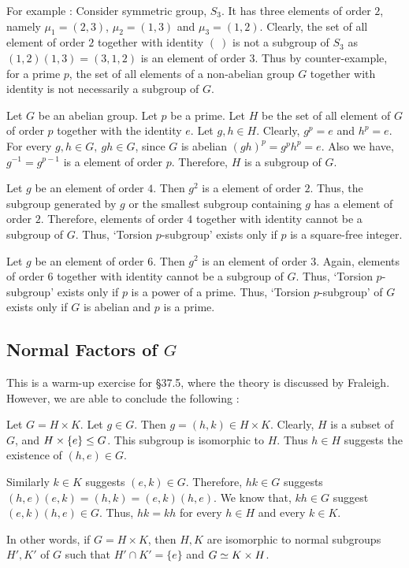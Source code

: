 For example :
Consider symmetric group, $S_3$.
It has three elements of order $2$, namely $\mu_1 = (2,3)$, $\mu_2 = (1,3)$ and $\mu_3 = (1,2)$.
Clearly, the set of all element of order $2$ together with identity $(\ )$ is not a subgroup of $S_3$ as $(1,2)(1,3) = (3,1,2)$ is an element of order $3$.
Thus by counter-example, for a prime $p$, the set of all elements of a non-abelian group $G$ together with identity is not necessarily a subgroup of $G$.

Let $G$ be an abelian group.
Let $p$ be a prime.
Let $H$ be the set of all element of $G$ of order $p$ together with the identity $e$.
Let $g,h \in H$.
Clearly, $g^p = e$ and $h^p = e$.
For every $g,h \in G,\ gh \in G$, since $G$ is abelian $(gh)^p = g^p h^p = e$.
Also we have, $g^{-1} = g^{p-1}$ is a element of order $p$.
Therefore, $H$ is a subgroup of $G$.

Let $g$ be an element of order $4$.
Then $g^2$ is a element of order $2$.
Thus, the subgroup generated by $g$ or the smallest subgroup containing $g$ has a element of order $2$.
Therefore, elements of order $4$ together with identity cannot be a subgroup of $G$.
Thus, `Torsion $p$-subgroup' exists only if $p$ is a square-free integer.

Let $g$ be an element of order $6$.
Then $g^2$ is an element of order $3$.
Again, elements of order $6$ together with identity cannot be a subgroup of $G$.
Thus, `Torsion $p$-subgroup' exists only if $p$ is a power of a prime. Thus, `Torsion $p$-subgroup' of $G$ exists only if $G$ is abelian and $p$ is a prime.

\subsection{Normal Factors of $G$}
This is a warm-up exercise for \S37.5, where the theory is discussed by Fraleigh. However, we are able to conclude the following :
\begin{remark}
	Let $G = H \times K$.
	Let $g \in G$. Then $g = (h,k) \in H \times K$.%
	Clearly, $H$ is a subset of $G$, and  $H \times \{e\} \le G$.
	This subgroup is isomorphic to $H$.
	Thus $h \in H$ suggests the existence of  $(h,e) \in G$.

	Similarly $k \in K$ suggests $(e,k) \in G$.
	Therefore, $hk \in G$ suggests $(h,e)(e,k) = (h,k) = (e,k)(h,e)$.
	We know that, $kh \in G$ suggest $(e,k)(h,e) \in G$.
	Thus, $hk = kh$ for every $h \in H$ and every $k \in K$.

	In other words, if $G = H \times K$, then $H,K$ are isomorphic to normal subgroups $H',K'$ of $G$ such that $H' \cap K' = \{ e \}$ and $G \simeq K \times H$.
\end{remark}

